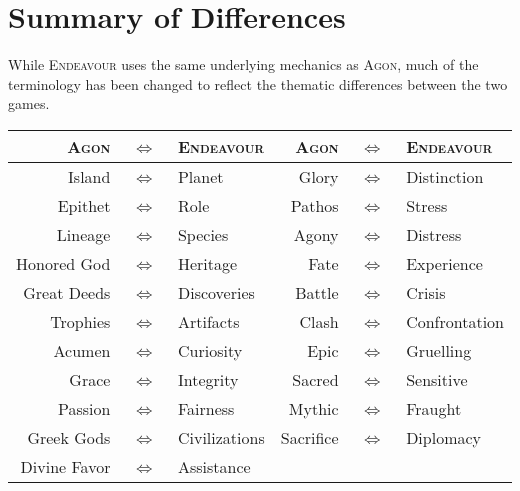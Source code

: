 \documentclass[11pt, a5paper, parskip=half-, DIV=12]{scrartcl}
\newcommand{\tablesep}{\,\,$\Longleftrightarrow$\,\,}
\newcommand{\AGON}{\textsc{Agon}}%
\newcommand{\ENDEAVOUR}{\textsc{Endeavour}}%
\begin{document}
\section*{Summary of Differences}
While \ENDEAVOUR{} uses the same underlying mechanics as \AGON{}, much of the terminology has been changed to reflect the thematic differences between the two games.%
\small
\begin{center}
\begin{tabular}{r@{}c@{}l@{\hskip 4.5ex}r@{}c@{}l} \toprule
\AGON & \tablesep & \ENDEAVOUR & \AGON & \tablesep & \ENDEAVOUR \\ \midrule
Island & \tablesep & Planet & Glory & \tablesep & Distinction \\[1.5ex]
Epithet & \tablesep & Role & Pathos & \tablesep & Stress \\
Lineage & \tablesep & Species & Agony & \tablesep & Distress \\
Honored God & \tablesep & Heritage & Fate & \tablesep & Experience \\[1.5ex]
Great Deeds & \tablesep & Discoveries & Battle & \tablesep & Crisis\\ 
Trophies & \tablesep & Artifacts & Clash & \tablesep & Confrontation \\[1.5ex]
Acumen & \tablesep & Curiosity & Epic & \tablesep & Gruelling \\
Grace & \tablesep & Integrity & Sacred & \tablesep & Sensitive \\
Passion & \tablesep & Fairness & Mythic & \tablesep & Fraught \\[1.5ex]
Greek Gods & \tablesep & Civilizations & Sacrifice & \tablesep & Diplomacy \\ 
Divine Favor & \tablesep & Assistance & & & \\ \bottomrule 
\end{tabular}
\end{center}
\normalsize
\end{document}
